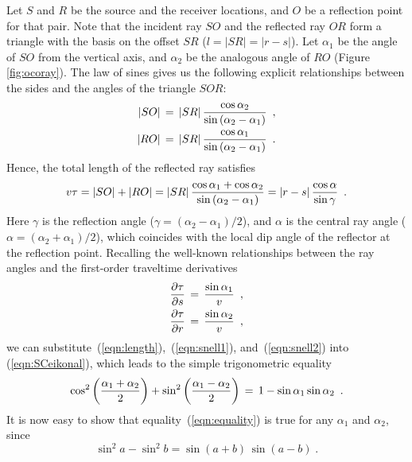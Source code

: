 Let $S$ and $R$ be the source and the receiver locations, and $O$ be a
reflection point for that pair.  Note that the incident ray $SO$ and
the reflected ray $OR$ form a triangle with the basis on the offset
$SR$ ($l=|SR|=|r-s|$).  Let $\alpha_1$ be the angle of $SO$ from the
vertical axis, and $\alpha_2$ be the analogous angle of $RO$ (Figure
\ref{fig:ocoray}). The law of sines gives us the following explicit
relationships between the sides and the angles of the triangle $SOR$:
\begin{eqnarray}
|SO|\,=\,|SR|\, {\cos{\alpha_2} \over
\sin{\left(\alpha_2-\alpha_1\right)}} \,\,\,, 
\label{eqn:triangle1} \\ 
|RO|\,=\,|SR|\, {\cos{\alpha_1} \over
\sin{\left(\alpha_2-\alpha_1\right)}} \,\,\,.
\label{eqn:triangle2} 
\end{eqnarray} 
Hence, the total length of the reflected ray satisfies
\begin{equation}
v \tau = |SO|+|RO|=|SR|\,  {{\cos{\alpha_1}+ \cos{\alpha_2}} \over
\sin{\left(\alpha_2-\alpha_1\right)}} = |r-s|\,{\cos{\alpha} \over
\sin{\gamma}} \,\,\,.
\label{eqn:length} 
\end{equation}
Here $\gamma$ is the reflection angle ($\gamma = (\alpha_2 -
\alpha_1)/2$), and $\alpha$ is the central ray angle ($\alpha =
(\alpha_2 + \alpha_1)/2$), which coincides with the local dip angle of
the reflector at the reflection point.  Recalling the well-known
relationships between the ray angles and the first-order traveltime
derivatives
\begin{eqnarray}
{{\partial \tau} \over {\partial s}} \,=\,{ {\sin{\alpha_1}} \over
{v}} \,\,\,,
\label{eqn:snell1}\\
{{\partial \tau} \over {\partial r}} \,=\, {{\sin{\alpha_2}} \over {v}}  
\label{eqn:snell2}\,\,\,,
\end{eqnarray}  
we can substitute~(\ref{eqn:length}),~(\ref{eqn:snell1}), and~(\ref{eqn:snell2}) into 
(\ref{eqn:SCeikonal}), which  leads to the simple trigonometric equality
\begin{equation}
\cos^2{\left( {\alpha_1 + \alpha_2} \over 2 \right)} +  
\sin^2{\left( {\alpha_1 - \alpha_2} \over 2 \right)}\, = \, 1 -
\sin{\alpha_1} \sin{\alpha_2} \,\,\,. 
\label{eqn:equality} 
\end{equation}
It is now easy to show that equality~(\ref{eqn:equality}) is true for any
$\alpha_1$ and $\alpha_2$, since
\[
\sin^2{a} - \sin^2{b} = \sin{(a+b)}\,\sin{(a-b)}\;.
\]


